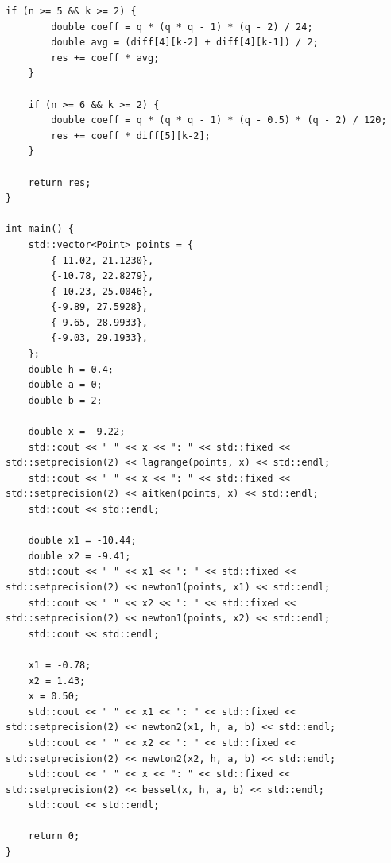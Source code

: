 \documentclass[14pt,a4paper]{extarticle}
\begin{document}
\begin{lstlisting}[basicstyle=\footnotesize]
	if (n >= 5 && k >= 2) {
		double coeff = q * (q * q - 1) * (q - 2) / 24;
		double avg = (diff[4][k-2] + diff[4][k-1]) / 2;
		res += coeff * avg;
	}
	
	if (n >= 6 && k >= 2) {
		double coeff = q * (q * q - 1) * (q - 0.5) * (q - 2) / 120;
		res += coeff * diff[5][k-2];
	}
	
	return res;
}

int main() {
	std::vector<Point> points = {
		{-11.02, 21.1230},
		{-10.78, 22.8279},
		{-10.23, 25.0046},
		{-9.89, 27.5928},
		{-9.65, 28.9933},
		{-9.03, 29.1933},
	};
	double h = 0.4;
	double a = 0;
	double b = 2;
	
	double x = -9.22;
	std::cout << " " << x << ": " << std::fixed << std::setprecision(2) << lagrange(points, x) << std::endl;
	std::cout << " " << x << ": " << std::fixed << std::setprecision(2) << aitken(points, x) << std::endl;
	std::cout << std::endl;
	
	double x1 = -10.44;
	double x2 = -9.41;
	std::cout << " " << x1 << ": " << std::fixed << std::setprecision(2) << newton1(points, x1) << std::endl;
	std::cout << " " << x2 << ": " << std::fixed << std::setprecision(2) << newton1(points, x2) << std::endl;
	std::cout << std::endl;
	
	x1 = -0.78;
	x2 = 1.43;
	x = 0.50;
	std::cout << " " << x1 << ": " << std::fixed << std::setprecision(2) << newton2(x1, h, a, b) << std::endl;
	std::cout << " " << x2 << ": " << std::fixed << std::setprecision(2) << newton2(x2, h, a, b) << std::endl;
	std::cout << " " << x << ": " << std::fixed << std::setprecision(2) << bessel(x, h, a, b) << std::endl;
	std::cout << std::endl;
	
	return 0;
}
	\end{lstlisting}
	
\end{document}
